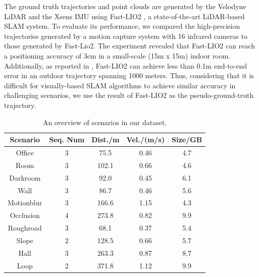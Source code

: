 \documentclass[conference]{IEEEtran}
\begin{document}
The ground truth trajectories and point clouds are generated by the Velodyne LiDAR and the Xsens IMU using Fast-LIO2 \cite{xu2022fast}, a state-of-the-art LiDAR-based SLAM system. To evaluate its performance, we compared the high-precision trajectories generated by a motion capture system with 16 infrared cameras to those generated by Fast-Lio2. The experiment revealed that Fast-LIO2 can reach a positioning accuracy of 3cm in a small-scale (15m x 15m) indoor room. Additionally, as reported in \cite{xu2022fast}, Fast-LIO2 can achieve less than 0.1m end-to-end error in an outdoor trajectory spanning 1000 meters. Thus, considering that it is difficult for visually-based SLAM algorithms to achieve similar accuracy in challenging scenarios, we use the result of Fast-LIO2 as the pseudo-ground-truth trajectory.
	
	\begin{center}
	\begin{table}[h]
		\caption{An overview of scenarios in our dataset.}
		\label{overview}
		\centering
		\begin{tabular}{ccccc}
			\hline
			

			
			{Scenario} & {Seq. Num} & {Dist./m}  & {Vel./(m/s)}& {Size/GB} \\
			\hline
			
			{Office} & {3} & {75.5}  & {0.46}& {4.7}  \\
			{Room} & {3} & {102.1}  & {0.66}& {4.6}   \\
			\hline		
			
			{Darkroom} & {3} & {92.0}  & {0.45}& {6.1}  \\
			
			{Wall} & {3} & {86.7}  & {0.46}& {5.6}   \\
			{Motionblur} & {3} & {166.6}  & {1.15}& {4.3}   \\
			
			{Occlusion} & {4} & {273.8}  & {0.82}& {9.9}  \\
			\hline

			{Roughroad} & {3} & {68.1}  & {0.37}& {5.4}   \\
			{Slope} & {2} & {128.5}  & {0.66}& {5.7}  \\		
			


			{Hall} & {3} & {263.3}  & {0.87}& {8.7}  \\

			{Loop} & {2} & {371.8}  & {1.12}& {9.9}  \\
			

\end{tabular}
\end{table}
\end{center}
\end{document}
